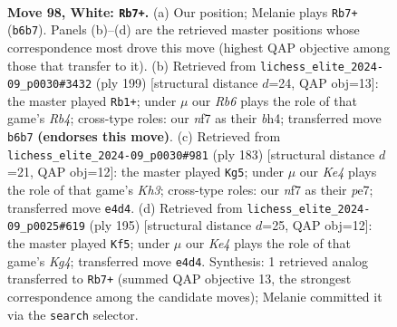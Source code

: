 \documentclass[11pt]{article}
\begin{document}
\clearpage

\begin{figure}[p]\centering
\begin{subfigure}{0.46\textwidth}\centering
\resizebox{\linewidth}{!}{%
\newchessgame
\chessboard[
  setfen={r7/3k1n2/PR6/6P1/4K3/7P/2P1B3/8 w - - 3 98},
  showmover=false,
  pgfstyle=straightmove, color=movearrow, markmove={b6-b7}
]}
\caption{}
\end{subfigure}\hfill
\begin{subfigure}{0.46\textwidth}\centering
\resizebox{\linewidth}{!}{%
\newchessgame
\chessboard[
  setfen={5R2/3k4/8/1r3p2/6pB/7p/8/6K1 b - - 97 100},
  showmover=false,
  pgfstyle=straightmove, color=movearrow, markmove={b5-b1}
]}
\caption{}
\end{subfigure}
\\[4pt]
\begin{subfigure}{0.46\textwidth}\centering
\resizebox{\linewidth}{!}{%
\newchessgame
\chessboard[
  setfen={8/p3P3/4K2k/7p/8/8/5r1p/7R b - - 7 92},
  showmover=false,
  pgfstyle=straightmove, color=movearrow, markmove={h6-g5}
]}
\caption{}
\end{subfigure}\hfill
\begin{subfigure}{0.46\textwidth}\centering
\resizebox{\linewidth}{!}{%
\newchessgame
\chessboard[
  setfen={8/7p/4R3/1P4k1/8/1K6/3rp3/8 b - - 0 98},
  showmover=false,
  pgfstyle=straightmove, color=movearrow, markmove={g5-f5}
]}
\caption{}
\end{subfigure}
\caption{\textbf{Move 98, White: \texttt{Rb7+}.} (a) Our position; Melanie plays \texttt{Rb7+} (\texttt{b6b7}). Panels (b)--(d) are the retrieved master positions whose correspondence most drove this move (highest QAP objective among those that transfer to it). (b) Retrieved from \texttt{lichess\_elite\_2024-09\_p0030\#3432} (ply 199) [structural distance $d$=24, QAP obj=13]: the master played \texttt{Rb1+}; under $\mu$ our \emph{Rb6} plays the role of that game's \emph{Rb4}; cross-type roles: our \emph{n}f7 as their \emph{b}h4; transferred move \texttt{b6b7} \textbf{(endorses this move)}. (c) Retrieved from \texttt{lichess\_elite\_2024-09\_p0030\#981} (ply 183) [structural distance $d$=21, QAP obj=12]: the master played \texttt{Kg5}; under $\mu$ our \emph{Ke4} plays the role of that game's \emph{Kh3}; cross-type roles: our \emph{n}f7 as their \emph{p}e7; transferred move \texttt{e4d4}. (d) Retrieved from \texttt{lichess\_elite\_2024-09\_p0025\#619} (ply 195) [structural distance $d$=25, QAP obj=12]: the master played \texttt{Kf5}; under $\mu$ our \emph{Ke4} plays the role of that game's \emph{Kg4}; transferred move \texttt{e4d4}. Synthesis: 1 retrieved analog transferred to \texttt{Rb7+} (summed QAP objective 13, the strongest correspondence among the candidate moves); Melanie committed it via the \texttt{search} selector.}
\label{fig:thought-m194}
\end{figure}
\end{document}
